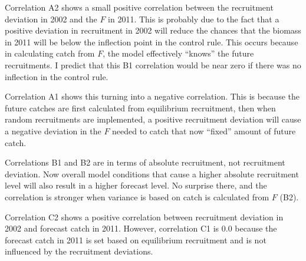 Correlation A2 shows a small positive correlation between the recruitment deviation in 2002 and the $F$ in 2011. This is probably due to the fact that a positive deviation in recruitment in 2002 will reduce the chances that the biomass in 2011 will be below the inflection point in the control rule. This occurs because in calculating catch from $F$, the model effectively ``knows'' the future recruitments. I predict that this B1 correlation would be near zero if there was no inflection in the control rule.

Correlation A1 shows this turning into a negative correlation. This is because the future catches are first calculated from equilibrium recruitment, then when random recruitments are implemented, a positive recruitment deviation will cause a negative deviation in the $F$ needed to catch that now ``fixed'' amount of future catch.

Correlations B1 and B2 are in terms of absolute recruitment, not recruitment deviation. Now overall model conditions that cause a higher absolute recruitment level will also result in a higher forecast level. No surprise there, and the correlation is stronger when variance is based on catch is calculated from $F$ (B2).

Correlation C2 shows a positive correlation between recruitment deviation in 2002 and forecast catch in 2011. However, correlation C1 is 0.0 because the forecast catch in 2011 is set based on equilibrium recruitment and is not influenced by the recruitment deviations.

